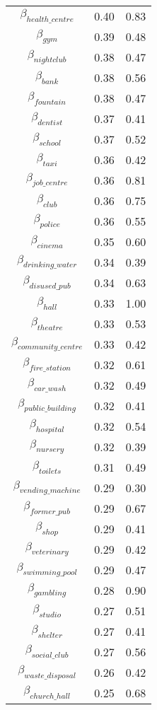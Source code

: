 \begin{tabular}{c|cc}
$\beta_{health\_centre}$ & 0.40 & 0.83 \\
$\beta_{gym}$ & 0.39 & 0.48 \\
$\beta_{nightclub}$ & 0.38 & 0.47 \\
$\beta_{bank}$ & 0.38 & 0.56 \\
$\beta_{fountain}$ & 0.38 & 0.47 \\
$\beta_{dentist}$ & 0.37 & 0.41 \\
$\beta_{school}$ & 0.37 & 0.52 \\
$\beta_{taxi}$ & 0.36 & 0.42 \\
$\beta_{job\_centre}$ & 0.36 & 0.81 \\
$\beta_{club}$ & 0.36 & 0.75 \\
$\beta_{police}$ & 0.36 & 0.55 \\
$\beta_{cinema}$ & 0.35 & 0.60 \\
$\beta_{drinking\_water}$ & 0.34 & 0.39 \\
$\beta_{disused\_pub}$ & 0.34 & 0.63 \\
$\beta_{hall}$ & 0.33 & 1.00 \\
$\beta_{theatre}$ & 0.33 & 0.53 \\
$\beta_{community\_centre}$ & 0.33 & 0.42 \\
$\beta_{fire\_station}$ & 0.32 & 0.61 \\
$\beta_{car\_wash}$ & 0.32 & 0.49 \\
$\beta_{public\_building}$ & 0.32 & 0.41 \\
$\beta_{hospital}$ & 0.32 & 0.54 \\
$\beta_{nursery}$ & 0.32 & 0.39 \\
$\beta_{toilets}$ & 0.31 & 0.49 \\
$\beta_{vending\_machine}$ & 0.29 & 0.30 \\
$\beta_{former\_pub}$ & 0.29 & 0.67 \\
$\beta_{shop}$ & 0.29 & 0.41 \\
$\beta_{veterinary}$ & 0.29 & 0.42 \\
$\beta_{swimming\_pool}$ & 0.29 & 0.47 \\
$\beta_{gambling}$ & 0.28 & 0.90 \\
$\beta_{studio}$ & 0.27 & 0.51 \\
$\beta_{shelter}$ & 0.27 & 0.41 \\
$\beta_{social\_club}$ & 0.27 & 0.56 \\
$\beta_{waste\_disposal}$ & 0.26 & 0.42 \\
$\beta_{church\_hall}$ & 0.25 & 0.68 \\

\end{tabular}
